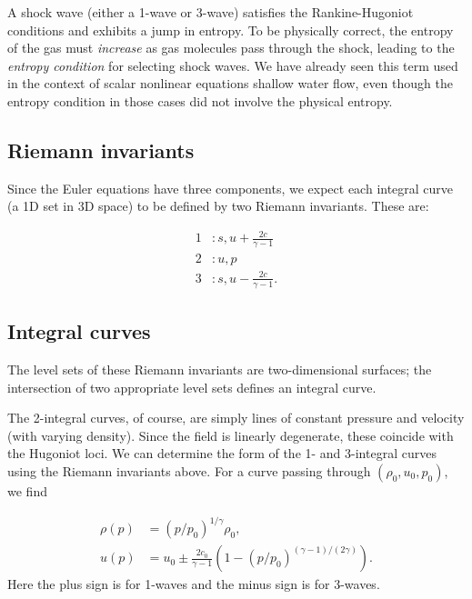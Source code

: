 \documentclass{SIAMbook2016}
\begin{document}
A shock wave (either a 1-wave or 3-wave) satisfies the Rankine-Hugoniot
conditions and exhibits a jump in entropy. To be physically correct, the
entropy of the gas must \emph{increase} as gas molecules pass through
the shock, leading to the \emph{entropy condition} for selecting shock
waves. We have already seen this term used in the context of scalar
nonlinear equations shallow water flow, even though the entropy
condition in those cases did not involve the physical entropy.

\hypertarget{riemann-invariants}{%
\subsection{Riemann invariants}\label{riemann-invariants}}

Since the Euler equations have three components, we expect each integral
curve (a 1D set in 3D space) to be defined by two Riemann invariants.
These are:

\begin{align}
1 & : s, u+\frac{2c}{\gamma-1} \\
2 & : u, p \\
3 & : s, u-\frac{2c}{\gamma-1}.
\end{align}

\hypertarget{integral-curves}{%
\subsection{Integral curves}\label{integral-curves}}

The level sets of these Riemann invariants are two-dimensional surfaces;
the intersection of two appropriate level sets defines an integral
curve.

The 2-integral curves, of course, are simply lines of constant pressure
and velocity (with varying density). Since the field is linearly
degenerate, these coincide with the Hugoniot loci. We can determine the
form of the 1- and 3-integral curves using the Riemann invariants above.
For a curve passing through \((\rho_0,u_0,p_0)\), we find

\begin{align}
    \rho(p) &= (p/p_0)^{1/\gamma} \rho_0,\\
    u(p) & = u_0 \pm \frac{2c_0}{\gamma-1}\left(1-(p/p_0)^{(\gamma-1)/(2\gamma)}\right).
\end{align} Here the plus sign is for 1-waves and the minus sign is for
3-waves.
\end{document}
